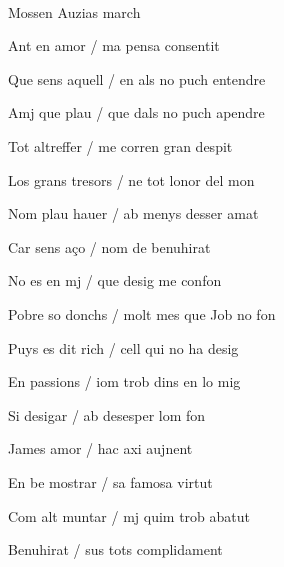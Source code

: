 \documentclass[12pt]{article}
\renewcommand{\espaiAbansEtiquetaPoema}{\vspace{0ex}}
\begin{document}
\begin{estrofa}

\espaiAbansEtiquetaPoema

\\

\begin{rubrica}

Mossen Auzias march

\end{rubrica}

\end{estrofa}


\begin{estrofa}

 Ant en amor / ma pensa consentit

 Que sens aquell / en als no puch entendre

 Amj que plau / que dals no puch apendre

 Tot altreffer / me corren gran despit

 Los grans tresors / ne tot lonor del mon

 Nom plau hauer / ab menys desser amat

 Car sens a\c{c}o / nom de benuhirat

 No es en mj / que desig me confon

\end{estrofa}



\begin{estrofa}

 Pobre so donchs / molt mes que Job no fon

 Puys es dit rich / cell qui no ha desig

 En passions / iom trob dins en lo mig

 Si desigar / ab desesper lom fon

 James amor / hac axi aujnent

 En be mostrar / sa famosa virtut

 Com alt muntar / mj quim trob abatut

 Benuhirat / sus tots complidament

\end{estrofa}
\end{document}
